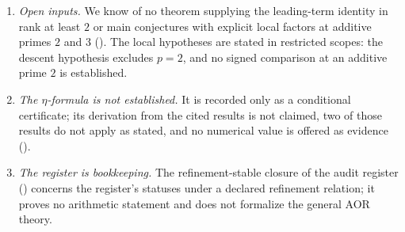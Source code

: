 \begin{enumerate}
  equality, for example over $\Q$, but the paper provides no procedure for
  computing them or for deciding the recognition predicate.
\item \emph{Open inputs.}  We know of no theorem supplying the
  leading-term identity in rank at least $2$ or main conjectures with
  explicit local factors at additive primes $2$ and $3$
  ().  The local
  hypotheses are stated in restricted scopes: the descent hypothesis
  excludes $p=2$, and no signed comparison at an additive prime $2$ is
  established.
\item \emph{The $\eta$-formula is not established.}  It is recorded only
  as a conditional certificate; its derivation from the cited results is
  not claimed, two of those results do not apply as stated, and no
  numerical value is offered as evidence ().
\item \emph{The register is bookkeeping.}  The refinement-stable closure
  of the audit register () concerns the
  register's statuses under a declared refinement relation; it proves no
  arithmetic statement and does not formalize the general AOR theory.
\end{enumerate}


